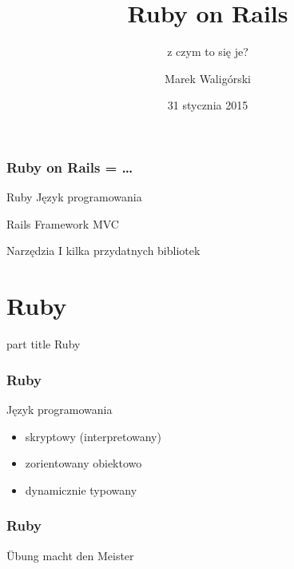 \documentclass{beamer}
\title{Ruby on Rails}
\subtitle{z czym to się je?}
\author{Marek Waligórski}
\date{31 stycznia 2015}
\institute{InfoMEET Poznań}
\newcommand{\mytitle}[1]{%
    \begin{frame}[plain]
        \begin{centering}
        \vspace{1em}\par
            \begin{beamercolorbox}[rounded=true,sep=4pt,center]{part title}
               \huge #1
            \end{beamercolorbox}
        \end{centering}
    \end{frame}
}
\newcommand{\mysection}[1]{%
    \section{#1}
    \mytitle{#1}
}
\begin{document}
\begin{frame}[fragile]
\titlepage
\end{frame}

\begin{frame}[fragile]
\frametitle{Ruby on Rails = \ldots}
\begin{block}{Ruby}
    Język programowania
\end{block}
\begin{block}{Rails}
    Framework MVC
\end{block}
\begin{block}{Narzędzia}
    I kilka przydatnych bibliotek
\end{block}
\end{frame}

\mysection{Ruby}

\begin{frame}[fragile]\frametitle{Ruby}
    \begin{block}{Język programowania}
    \begin{itemize}
        \item skryptowy (interpretowany)
        \item zorientowany obiektowo
        \item dynamicznie typowany
    \end{itemize}
    \end{block}
\end{frame}

\begin{frame}[fragile]\frametitle{Ruby}
\centering \huge \color{orange} Übung macht den Meister \par
\end{frame}
\end{document}
